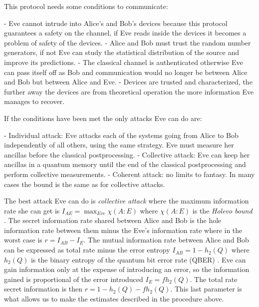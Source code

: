 This protocol needs some conditions to communicate:

- Eve cannot intrude into Alice’s and Bob’s devices because this protocol guarantees a safety on the channel, if Eve reads inside the devices it becomes a problem of safety of the devices.
- Alice and Bob must trust the random number generators, if not Eve can study the statistical distribution of the source and improve its predictions.
- The classical channel is authenticated otherwise Eve can pass itself off as Bob and  communication would no longer be between Alice and Bob but between Alice and Eve.
- Devices are trusted and characterized, the further away the devices are from theoretical operation the more information Eve manages to recover.

If the conditions have been met the only attacks Eve can do are:

- Individual attack: Eve attacks each of the systems going from Alice to Bob independently of all others, using the same strategy. Eve must measure her ancillas before the classical postprocessing.
- Collective attack: Eve can keep her ancillas in a quantum memory until the end of the classical postprocessing and perform collective measurements.
- Coherent attack: no limits to fantasy. In many cases the bound is the same as for collective attacks.

The best attack Eve can do is \textit{collective attack} where the maximum information rate she can get is  $I_{AE} = \max_{Eve} \chi(A:E)$ where $\chi(A:E)$ is the \textit{Holevo bound} \cite{a24}.  The secret information rate shared between Alice and Bob is the hole information rate between them minus the Eve's information rate where in the worst case is $r = I_{AB} - I_{E}$. The mutual information rate between Alice and Bob can be expressed as total rate minus the error entropy $I_{AB} = 1 - h_2(Q)$ where $h_2(Q)$ is the binary entropy of the quantum bit error rate (QBER) \cite{a24}. Eve can gain information only at the expense of introducing an error, so the information gained is proportional of the error introduced $I_E = f h_2(Q)$. The total rate secret information is then $r = 1 - h_2(Q) - f h_2(Q)$. This last parameter is what allows us to make the estimates described in the procedure above.


